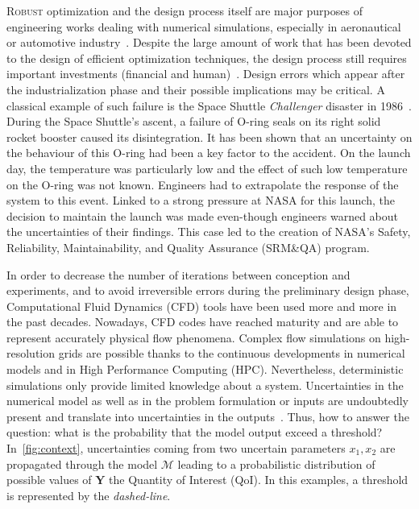 \lettrine{R}{obust} optimization and the design process itself are major purposes of engineering works dealing with numerical simulations, especially in aeronautical or automotive industry~\cite{duchaine2009}. Despite the large amount of work that has been devoted to the design of efficient optimization techniques, the design process still requires important investments (financial and human)~\cite{forrester2009}. Design errors which appear after the industrialization phase and their possible implications may be critical. A classical example of such failure is the Space Shuttle \emph{Challenger} disaster in 1986~\cite{draper1995}. During the Space Shuttle's ascent, a failure of O-ring seals on its right solid rocket booster caused its disintegration. It has been shown that an uncertainty on the behaviour of this O-ring had been a key factor to the accident. On the launch day, the temperature was particularly low and the effect of such low temperature on the O-ring was not known. Engineers had to extrapolate the response of the system to this event. Linked to a strong pressure at NASA for this launch, the decision to maintain the launch was made even-though engineers warned about the uncertainties of their findings. This case led to the creation of NASA's Safety, Reliability, Maintainability, and Quality Assurance (SRM\&QA) program.

In order to decrease the number of iterations between conception and experiments, and to avoid irreversible errors during the preliminary design phase, Computational Fluid Dynamics (CFD) tools have been used more and more in the past decades. Nowadays, CFD codes have reached maturity and are able to represent accurately physical flow phenomena. Complex flow simulations on high-resolution grids are possible thanks to the continuous developments in numerical models and in High Performance Computing (HPC). Nevertheless, deterministic simulations only provide limited knowledge about a system. Uncertainties in the numerical model as well as in the problem formulation or inputs are undoubtedly present and translate into uncertainties in the outputs~\cite{Sacks1989}. Thus, how to answer the question: what is the probability that the model output exceed a threshold? In~\cref{fig:context}, uncertainties coming from two uncertain parameters $x_1,x_2$ are propagated through the model $\mathcal{M}$ leading to a probabilistic distribution of possible values of $\mathbf{Y}$ the Quantity of Interest (QoI). In this examples, a threshold is represented by the \emph{dashed-line}.

